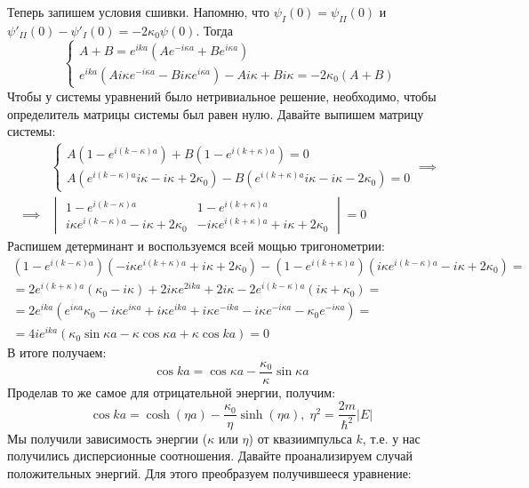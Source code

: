 Теперь запишем условия сшивки. Напомню, что $\psi_I(0) = \psi_{II}(0)$ и $\psi'_{II}(0) - \psi'_I(0) = -2\kappa_0\psi(0)$. Тогда
\[
\begin{cases}
A + B = e^{ika}\left(Ae^{-i\kappa a} + Be^{i\kappa a}\right)\\
e^{ika}\left(A i \kappa e^{-i\kappa a} - B i \kappa e^{i\kappa a}\right) - Ai\kappa + Bi\kappa = -2\kappa_0(A+B)
\end{cases}
\]
Чтобы у системы уравнений было нетривиальное решение, необходимо, чтобы определитель матрицы системы был равен нулю. Давайте выпишем матрицу системы:
\begin{align*}
&\begin{cases}
A\left(1 - e^{i(k-\kappa)a}\right) + B\left(1 - e^{i(k+\kappa)a}\right) = 0\\
A \left(e^{i(k-\kappa)a}i\kappa - i\kappa + 2\kappa_0\right) - B\left(e^{i(k+\kappa)a}i\kappa - i\kappa - 2\kappa_0\right) = 0
\end{cases} \implies\\
\implies &\begin{vmatrix}
1 - e^{i(k-\kappa)a} & 1 - e^{i(k+\kappa)a} \\
i \kappa e^{i(k-\kappa)a} - i\kappa + 2\kappa_0 & - i \kappa e^{i (k +\kappa) a} + i\kappa + 2\kappa_0
\end{vmatrix}
= 0
\end{align*}
Распишем детерминант и воспользуемся всей мощью тригонометрии:
\begin{gather*}
\left(1 - e^{i(k-\kappa)a}\right) \left(-i \kappa e^{i (k + \kappa) a} + i \kappa + 2 \kappa_0\right) - \left(1 - e^{i (k + \kappa) a}\right) \left(i \kappa e^{i (k - \kappa) a} - i \kappa + 2 \kappa_0\right) = \\
= 2 e^{i (k + \kappa) a} (\kappa_0 - i \kappa) + 2 i \kappa e^{2 i k a} + 2 i \kappa - 2 e^{i (k - \kappa) a} (i \kappa + \kappa_0) = \\
= 2 e^{i k a} \left(e^{i \kappa a} \kappa_0 - i \kappa e^{i \kappa a} + i \kappa e^{i k a} + i \kappa e^{-i k a} - i \kappa e^{-i \kappa a} - \kappa_0 e^{-i \kappa a}\right) = \\
= 4 i e^{i k a} \left(\kappa_0 \sin \kappa a - \kappa \cos \kappa a + \kappa \cos k a \right) = 0
\end{gather*}
В итоге получаем:
\[
\cos ka = \cos\kappa a - \frac{\kappa_0}{\kappa}\sin\kappa a
\]
Проделав то же самое для отрицательной энергии, получим:
\[
\cos ka = \cosh(\eta a) - \frac{\kappa_0}{\eta}\sinh(\eta a), \; \eta^2 = \frac{2m}{\hbar^2}|E|
\]
Мы получили зависимость энергии ($\kappa$ или $\eta$) от квазиимпульса $k$, т.е. у нас получились дисперсионные соотношения. Давайте проанализируем случай положительных энергий. Для этого преобразуем получившееся уравнение:
